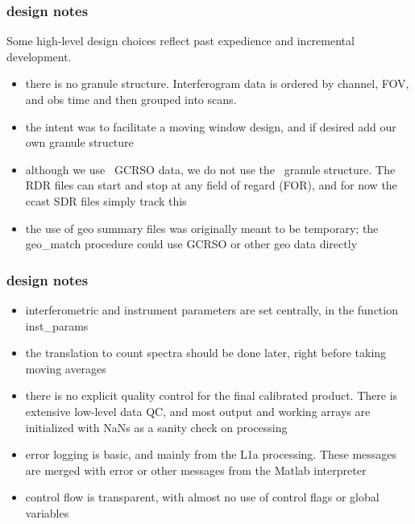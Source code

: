 \documentclass[11pt]{beamer}
\begin{document}
\begin{frame}
\frametitle{design notes}

Some high-level design choices reflect past expedience and
incremental development.

\begin{itemize}

 \item there is no granule structure.  Interferogram data is ordered
   by channel, FOV, and obs time and then grouped into scans.
  
 \item the intent was to facilitate a moving window design, and if
   desired add our own granule structure

 \item although we use \noaa\ GCRSO data, we do not use the
   \noaa\ granule structure.  The RDR files can start and stop at
   any field of regard (FOR), and for now the ccast SDR files
   simply track this

  \item the use of geo summary files was originally meant to be
    temporary; the geo\_match procedure could use GCRSO or other geo
    data directly

\end{itemize}

\end{frame}
\begin{frame}
\frametitle{design notes}

\begin{itemize}

  \item interferometric and instrument parameters are set centrally,
    in the function inst\_params

  \item the translation to count spectra should be done later, right
    before taking moving averages

  \item there is no explicit quality control for the final
    calibrated product.  There is extensive low-level data QC, and
    most output and working arrays are initialized with NaNs as a
    sanity check on processing

  \item error logging is basic, and mainly from the L1a processing.
    These messages are merged with error or other messages from the
    Matlab interpreter

  \item control flow is transparent, with almost no use of control
    flags or global variables

\end{itemize}

\end{frame}
\end{document}
